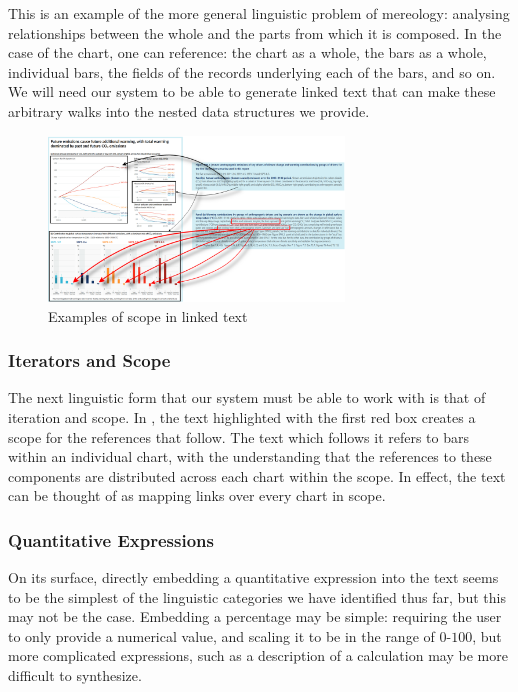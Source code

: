 This is an example of the more general linguistic problem of mereology: analysing relationships between the
whole and the parts from which it is composed. In the case of the chart, one can reference: the chart as a whole,
the bars as a whole, individual bars, the fields of the records underlying each of the bars, and so on.
We will need our system to be able to generate linked text that can make these arbitrary walks into the nested
data structures we provide.


\begin{figure}
   \includegraphics[width=0.7\textwidth]{fig/ipcc-visual-elements.png}
   \caption{Examples of scope in linked text}
   \label{fig:visual-element-scope}
\end{figure}

\subsubsection{Iterators and Scope}
The next linguistic form that our system must be able to work with is that of iteration and scope. 
In , the text highlighted with the first red box creates a scope for
the references that follow. The text which follows it refers to bars within an individual chart,
with the understanding that the references to these components are distributed across each chart
within the scope. In effect, the text can be thought of as mapping links over every chart in scope.

\subsubsection{Quantitative Expressions}
On its surface, directly embedding a quantitative expression into the text seems to be the simplest
of the linguistic categories we have identified thus far, but this may not be the case. Embedding
a percentage may be simple: requiring the user to only provide a numerical value, and scaling it
to be in the range of $0$-$100$, but more complicated expressions, such as a description of a calculation
may be more difficult to synthesize. 

